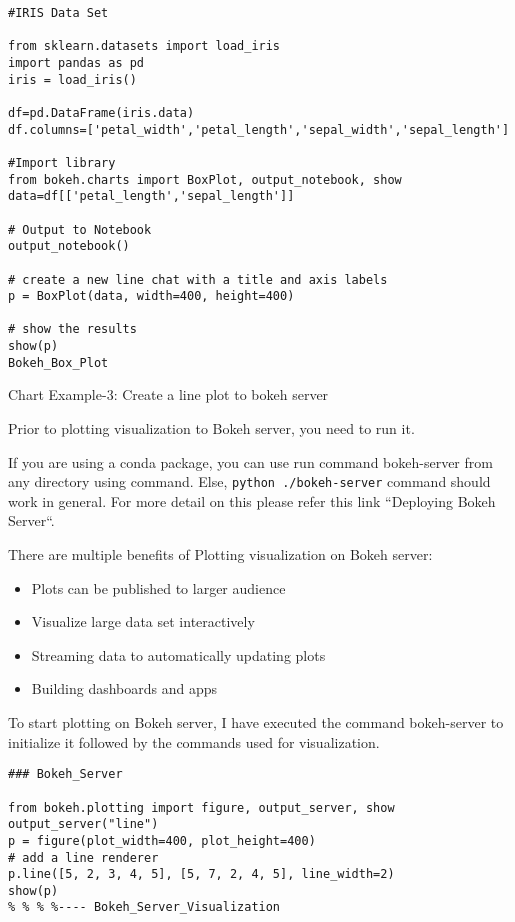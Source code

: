 \documentclass[a4paper,12pt]{article}
\begin{document}
\begin{framed}
\begin{verbatim}
#IRIS Data Set

from sklearn.datasets import load_iris
import pandas as pd
iris = load_iris()

df=pd.DataFrame(iris.data)
df.columns=['petal_width','petal_length','sepal_width','sepal_length']

#Import library
from bokeh.charts import BoxPlot, output_notebook, show
data=df[['petal_length','sepal_length']]

# Output to Notebook
output_notebook()

# create a new line chat with a title and axis labels
p = BoxPlot(data, width=400, height=400)

# show the results
show(p)
Bokeh_Box_Plot
\end{verbatim}
\end{framed}
\newpage

Chart Example-3: Create a line plot to bokeh server

Prior to plotting visualization to Bokeh server, you need to run it.

If you are using a conda package, you can use run command bokeh-server from any directory 
using command. Else, \texttt{python ./bokeh-server} command should work in general. For more detail on this 
please refer this link “Deploying Bokeh Server“.

There are multiple benefits of Plotting visualization on Bokeh server:

\begin{itemize}
\item Plots can be published to larger audience
\item Visualize large data set interactively
\item Streaming data to automatically updating plots
\item Building dashboards and apps
\end{itemize}
To start plotting on Bokeh server, I have executed the command bokeh-server to initialize it followed by 
the commands used for visualization.
\begin{framed}
	\begin{verbatim}
### Bokeh_Server

from bokeh.plotting import figure, output_server, show
output_server("line")
p = figure(plot_width=400, plot_height=400)
# add a line renderer
p.line([5, 2, 3, 4, 5], [5, 7, 2, 4, 5], line_width=2)
show(p)
% % % %---- Bokeh_Server_Visualization
\end{verbatim}
\end{framed}
\end{document}
